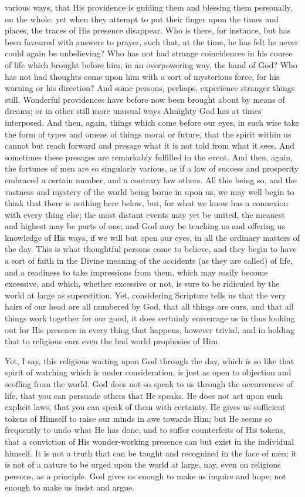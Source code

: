various ways, that His providence is guiding them and blessing them
personally, on the whole; yet when they attempt to put their finger
upon the times and places, the traces of His presence disappear. Who
is there, for instance, but has been favoured with answers to prayer,
such that, at the time, he has felt he never could again be
unbelieving? Who has not had strange coincidences in his course of
life which brought before him, in an overpowering way, the hand of
God? Who has not had thoughts come upon him with a sort of mysterious
force, for his warning or his direction? And some persons, perhaps,
experience stranger things still. Wonderful providences have before
now been brought about by means of dreams; or in other still more
unusual ways Almighty God has at times interposed. And then, again,
things which come before our eyes, in such wise take the form of types
and omens of things moral or future, that the spirit within us cannot
but reach forward and presage what it is not told from what it sees.
And sometimes these presages are remarkably fulfilled in the event.
And then, again, the fortunes of men are so singularly various, as if
a law of success and prosperity embraced a certain number, and a
contrary law others. All this being so, and the vastness and mystery
of the world being borne in upon us, we may well begin to think that
there is nothing here below, but, for what we know has a connexion
with every thing else; the most distant events may yet be united, the
meanest and highest may be parts of one; and God may be teaching us
and offering us knowledge of His ways, if we will but open our eyes,
in all the ordinary matters of the day. This is what thoughtful
persons come to believe, and they begin to have a sort of faith in the
Divine meaning of the accidents (as they are called) of life, and a
readiness to take impressions from them, which may easily become
excessive, and which, whether excessive or not, is sure to be
ridiculed by the world at large as superstition. Yet, considering
Scripture tells us that the very hairs of our head are all numbered by
God, that all things are ours, and that all things work together for
our good, it does certainly encourage us in thus looking out for His
presence in every thing that happens, however trivial, and in holding
that to religious ears even the bad world prophesies of Him.

Yet, I say, this religious waiting upon God through the day, which
is so like that spirit of watching which is under consideration, is
just as open to objection and scoffing from the world. God does not so
speak to us through the occurrences of life, that you can persuade
others that He speaks. He does not act upon such explicit laws, that
you can speak of them with certainty. He gives us sufficient tokens of
Himself to raise our minds in awe towards Him; but He seems so
frequently to undo what He has done, and to suffer counterfeits of His
tokens, that a conviction of His wonder-working presence can but exist
in the individual himself. It is not a truth that can be taught and
recognized in the face of men; it is not of a nature to be urged upon
the world at large, nay, even on religions persons, as a principle.
God gives us enough to make us inquire and hope; not enough to make us
insist and argue.

